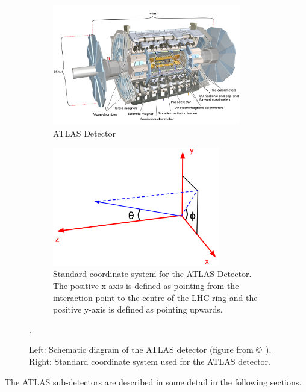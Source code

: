 \begin{figure}[H]
	\centering
	\begin{subfigure}[b]{0.45\textwidth}
	\includegraphics[width=0.9\textwidth]{Figures/3/detector.jpg}
	\caption{ATLAS Detector}
	\label{fig:detector}
	\end{subfigure}
	\begin{subfigure}[b]{0.45\textwidth}
	\includegraphics[width=0.8\textwidth]{Figures/3/ATLAS_coordinate_system.pdf}
	\caption{Standard coordinate system for the ATLAS Detector. The positive x-axis is defined as pointing from the interaction point to the centre of the LHC ring and the positive y-axis is defined as pointing upwards.}
	\label{fig:coord_system}
	\end{subfigure}
	\caption[]{Left: Schematic diagram of the ATLAS detector (figure from \(\copyright\) \cite{atlas}). Right: Standard coordinate system used for the ATLAS detector.}.
	\label{fig:detector}
\end{figure}

The ATLAS sub-detectors are described in some detail in the following sections.

